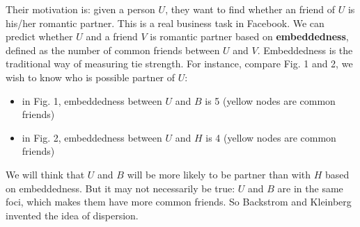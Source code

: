 \documentclass[]{article}
\begin{document}
Their motivation is: given a person $U$, they want to find whether an friend
of $U$ is his/her romantic partner. 
This is a real business task in Facebook.
We can predict whether $U$ and a
friend $V$ is romantic partner based on \textbf{embeddedness}, defined as the
number of common friends between $U$ and $V$. 
Embeddedness is the traditional way of measuring tie strength.
For instance, compare Fig. 1 and 2, we wish to know who is possible partner of $U$:

\begin{itemize}
\itemsep1pt\parskip0pt
\item
  in Fig. 1, embeddedness between $U$ and $B$ is 5 (yellow nodes
  are common friends)
\item
  in Fig. 2, embeddedness between $U$ and $H$ is 4 (yellow
  nodes are common friends)
\end{itemize}

We will think that $U$ and $B$ will be more likely to be partner than
with $H$ based on embeddedness.
 But it may not necessarily be true: 
 $U$ and $B$ are in the same foci,
which makes them have more common friends. So Backstrom and Kleinberg
invented the idea of dispersion.
\end{document}
